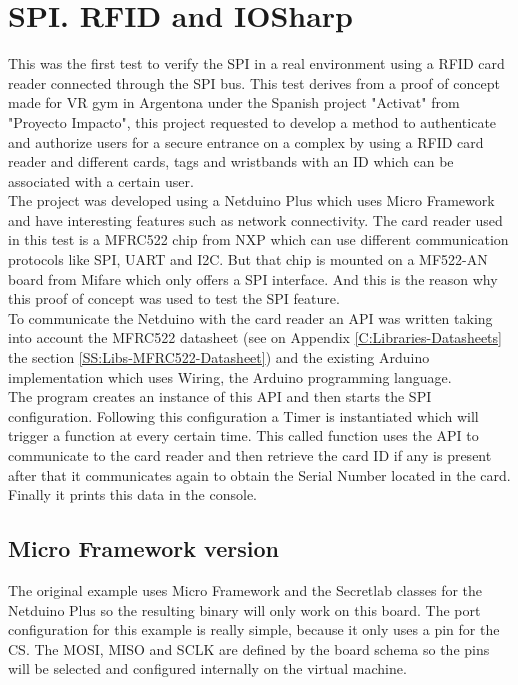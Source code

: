 \section{SPI. RFID and IOSharp}\label{S:rfid-iosharp}
This was the first test to verify the SPI in a real environment using a RFID card reader connected through the SPI bus. This test derives from a proof of concept made for VR gym in Argentona under the Spanish project "Activat" from "Proyecto Impacto", this project requested to develop a method to authenticate and authorize users for a secure entrance on a complex by using a RFID card reader and different cards, tags and wristbands with an ID which can be associated with a certain user.
\\
The project was developed using a Netduino Plus which uses Micro Framework and have interesting features such as network connectivity. The card reader used in this test is a MFRC522 chip from NXP which can use different communication protocols like SPI, UART and \gls{I2C}. But that chip is mounted on a MF522-AN board from Mifare which only offers a SPI interface. And this is the reason why this proof of concept was used to test the SPI feature.
\\
To communicate the Netduino with the card reader an API was written taking into account the MFRC522 datasheet (see on Appendix \ref{C:Libraries-Datasheets} the section \ref{SS:Libs-MFRC522-Datasheet}) and the existing Arduino implementation which uses Wiring, the Arduino programming language.
\\
The program creates an instance of this API and then starts the SPI configuration. Following this configuration a Timer is instantiated which will trigger a function at every certain time. This called function uses the API to communicate to the card reader and then retrieve the card ID if any is present after that it communicates again to obtain the Serial Number located in the card. Finally it prints this data in the console.

\subsection{Micro Framework version}\label{S:IOEx-SPI-Netduino}
The original example uses Micro Framework and the Secretlab classes for the Netduino Plus so the resulting binary will only work on this board. The port configuration for this example is really simple, because it only uses a pin for the \gls{CS}. The \gls{MOSI}, \gls{MISO} and \gls{SCLK} are defined by the board schema so the pins will be selected and configured internally on the virtual machine.

